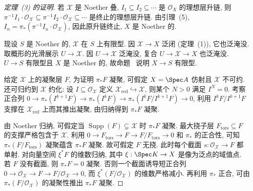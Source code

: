 \begin{proof}[定理~(3) 的证明]
若 $\mathcal X$ 是 Noether 叠, $I_1\subseteq I_2\subseteq\cdots$ 是 $\mathcal O_X$ 的理想层升链, 则 $\pi^{-1}I_1\cdot\mathcal O_{\mathcal X}\subseteq\pi^{-1}I_2\cdot\mathcal O_{\mathcal X}\subseteq\cdots$ 是终止的理想层升链. 由引理~(5), $I_n=\pi_*(\pi^{-1}I_n\cdot\mathcal O_{\mathcal X})$, 因此原升链终止, $X$ 是 Noether 的.

现设 $S$ 是 Noether 的, $\mathcal X$ 在 $S$ 上有限型. 因 $\mathcal X\to X$ 泛闭 (定理~(1)), 它也泛淹没. 取概形的光滑展示 $U\to\mathcal X$. 因 $U\to\mathcal X$ 泛淹没, 复合 $U\to\mathcal X\to X$ 也泛淹没. $U\to S$ 有限型且 $X$ 是 Noether 的, 故命题~ 说明 $X\to S$ 有限型.

给定 $\mathcal X$ 上的凝聚层 $F$, 为证明 $\pi_*F$ 凝聚, 可假定 $X=\Spec A$ 仿射且 $\mathcal X$ 不可约. 还可归约到 $\mathcal X$ 约化: 设 $I\subseteq\mathcal O_{\mathcal X}$ 定义 $\mathcal X_{\mathrm{red}}\hookrightarrow\mathcal X$, 则某个 $N>0$ 满足 $I^N=0$. 考察正合列 $0\to\pi_*(I^{k+1}F)\to\pi_*(I^kF)\to\pi_*(I^kF/I^{k+1}F)\to0$, 利用 $I^kF/I^{k+1}F$ 支撑在 $\mathcal X_{\mathrm{red}}$ 上而其推出凝聚, 由归纳得到 $\pi_*F$ 凝聚.

由 Noether 归纳, 可假定当 $\operatorname{Supp}(F)\subsetneq\mathcal X$ 时 $\pi_*F$ 凝聚. 最大挠子层 $F_{\mathrm{tors}}\subseteq F$ 的支撑严格包含于 $\mathcal X$. 利用 $0\to F_{\mathrm{tors}}\to F\to F/F_{\mathrm{tors}}\to0$ 和 $\pi_*$ 的正合性, 可知 $\pi_*(F/F_{\mathrm{tors}})$ 凝聚蕴含 $\pi_*F$ 凝聚. 故可假定 $F$ 无挠. 此时每个截面 $s:\mathcal O_{\mathcal X}\to F$ 都单射. 对向量空间 $\xi^*F$ 的维数归纳, 其中 $\xi:\Spec K\to\mathcal X$ 是像为泛点的域值点. 若 $F$ 没有截面, 则 $\pi_*F=0$ 凝聚. 否则一个截面诱导短正合列 $0\to\mathcal O_{\mathcal X}\to F\to F/\mathcal O_{\mathcal X}\to0$, 而 $\xi^*(F/\mathcal O_{\mathcal X})$ 的维数严格减小. 再利用 $\pi_*$ 正合, 可由 $\pi_*(F/\mathcal O_{\mathcal X})$ 的凝聚性推出 $\pi_*F$ 凝聚.
\end{proof}


